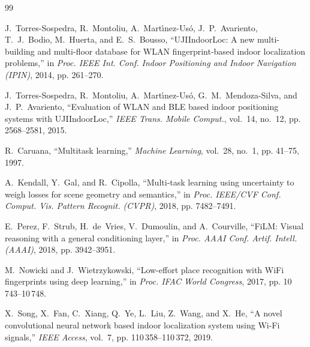 \documentclass[conference]{IEEEtran}
\begin{document}

\begin{thebibliography}{99}

J.~Torres-Sospedra, R.~Montoliu, A.~Mart{\'\i}nez-Us{\'o}, J.~P.~Avariento, T.~J.~Bodio, M.~Huerta, and E.~S.~Bousso, ``UJIIndoorLoc: A new multi-building and multi-floor database for WLAN fingerprint-based indoor localization problems,'' in \emph{Proc. IEEE Int. Conf. Indoor Positioning and Indoor Navigation (IPIN)}, 2014, pp. 261--270.

J.~Torres-Sospedra, R.~Montoliu, A.~Mart{\'\i}nez-Us{\'o}, G.~M.~Mendoza-Silva, and J.~P.~Avariento, ``Evaluation of WLAN and BLE based indoor positioning systems with UJIIndoorLoc,'' \emph{IEEE Trans. Mobile Comput.}, vol.~14, no.~12, pp. 2568--2581, 2015.

R.~Caruana, ``Multitask learning,'' \emph{Machine Learning}, vol.~28, no.~1, pp. 41--75, 1997.

A.~Kendall, Y.~Gal, and R.~Cipolla, ``Multi-task learning using uncertainty to weigh losses for scene geometry and semantics,'' in \emph{Proc. IEEE/CVF Conf. Comput. Vis. Pattern Recognit. (CVPR)}, 2018, pp. 7482--7491.

E.~Perez, F.~Strub, H.~de~Vries, V.~Dumoulin, and A.~Courville, ``FiLM: Visual reasoning with a general conditioning layer,'' in \emph{Proc. AAAI Conf. Artif. Intell. (AAAI)}, 2018, pp. 3942--3951.

M.~Nowicki and J.~Wietrzykowski, ``Low-effort place recognition with WiFi fingerprints using deep learning,'' in \emph{Proc. IFAC World Congress}, 2017, pp. 10\,743--10\,748.

X.~Song, X.~Fan, C.~Xiang, Q.~Ye, L.~Liu, Z.~Wang, and X.~He, ``A novel convolutional neural network based indoor localization system using Wi-Fi signals,'' \emph{IEEE Access}, vol.~7, pp. 110\,358--110\,372, 2019.

\end{thebibliography}
\end{document}

